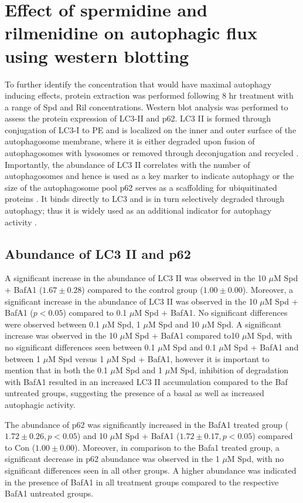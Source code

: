 {\section{Effect of spermidine and rilmenidine on autophagic flux using western blotting}
To further identify the concentration that would have maximal autophagy inducing effects, protein extraction was performed following 8 hr treatment with a range of Spd and Ril concentrations. Western blot analysis was performed to assess the protein expression of LC3-II and p62. LC3 II is formed through conjugation of LC3-I to PE and is localized on the inner and outer surface of the autophagosome membrane, where it is either degraded upon fusion of autophagosomes with lysosomes or removed through deconjugation and recycled \citep{kabeya2000}. Importantly, the abundance of LC3 II correlates with the number of autophagosomes and hence is used as a key marker to indicate autophagy or the size of the autophagosome pool \citep{loos2014} p62 serves as a scaffolding for ubiquitinated proteins \citep{sahani2014}. It binds directly to LC3 and is in turn selectively degraded through autophagy; thus it is widely used as an additional indicator for autophagy activity \citep{pankiv2007}.

\subsection{Abundance of LC3 II and p62}
A significant increase in the abundance of LC3 II was observed in the 10 $\mu$M Spd + BafA1 ($1.67 \pm 0.28$) compared to the control group ($1.00 \pm 0.00$). Moreover, a significant increase in the abundance of LC3 II was observed in the 10 $\mu$M Spd + BafA1 ($p < 0.05$) compared to 0.1 $\mu$M Spd + BafA1. No significant differences were observed between 0.1 $\mu$M Spd, 1 $\mu$M Spd and 10 $\mu$M Spd. A significant increase was observed in the 10 $\mu$M Spd + BafA1 compared to10 $\mu$M Spd, with no significant differences seen between 0.1 $\mu$M Spd and 0.1 $\mu$M Spd + BafA1 and between 1 $\mu$M Spd versus 1 $\mu$M Spd + BafA1, however it is important to mention that in both the 0.1 $\mu$M Spd  and 1 $\mu$M Spd, inhibition of degradation with BafA1 resulted in an increased LC3 II accumulation compared to the Baf untreated groups, suggesting the presence of a basal as well as increased autophagic activity.

The abundance of p62 was significantly increased in the BafA1 treated group ($1.72 \pm 0.26, p < 0.05$) and  10 $\mu$M Spd + BafA1 ($1.72 \pm 0.17, p< 0.05$) compared to Con ($1.00 \pm 0.00$). Moreover, in comparison to the Bafa1 treated group, a significant decrease in p62 abundance was observed in the 1 $\mu$M Spd, with no significant differences seen in all other groups. A higher abundance was indicated in the presence of BafA1 in all treatment groups compared to the respective BafA1 untreated groups.

}
